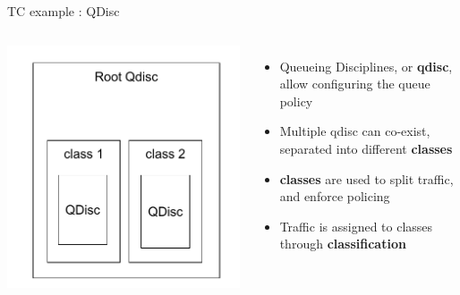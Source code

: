 \begin{frame}{TC example : QDisc}
	\begin{columns}
		\includegraphics[width=\textwidth]{slides/networking-traffic-control/tc-qdisc.pdf}
		\begin{itemize}
			\item Queueing Disciplines, or \textbf{qdisc}, allow configuring the queue policy
			\item Multiple qdisc can co-exist, separated into different \textbf{classes}
			\item \textbf{classes} are used to split traffic, and enforce policing
			\item Traffic is assigned to classes through \textbf{classification}
		\end{itemize}
	\end{columns}
\end{frame}

